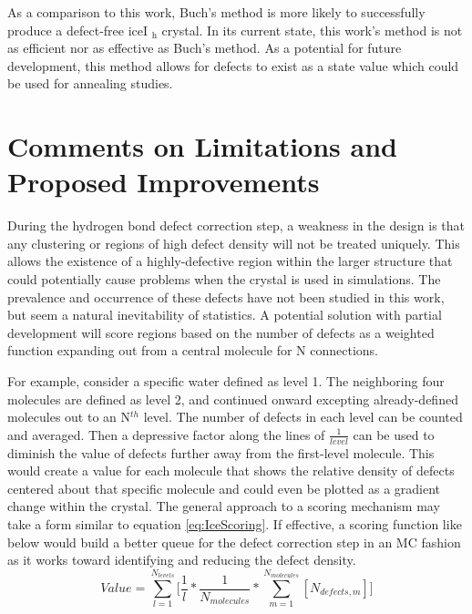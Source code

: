 As a comparison to this work, Buch's method is more likely to successfully produce a defect-free iceI $\mathrm{_{h}}$ crystal.
In its current state, this work's method is not as efficient nor as effective as Buch's method.
As a potential for future development, this method allows for defects to exist as a state value which could be used for annealing studies.



\section{Comments on Limitations and Proposed Improvements}

During the hydrogen bond defect correction step, a weakness in the design is that any clustering or regions of high defect density will not be treated uniquely.
This allows the existence of a highly-defective region within the larger structure that could potentially cause problems when the crystal is used in simulations. 
The prevalence and occurrence of these defects have not been studied in this work, but seem a natural inevitability of statistics. 
A potential solution with partial development will score regions based on the number of defects as a weighted function expanding out from a central molecule for N connections. 

For example, consider a specific water defined as level 1. 
The neighboring four molecules are defined as level 2, and continued onward excepting already-defined molecules out to an N$^{th}$ level. 
The number of defects in each level can be counted and averaged.
Then a depressive factor along the lines of $\frac{1}{level}$ can be used to diminish the value of defects further away from the first-level molecule.
This would create a value for each molecule that shows the relative density of defects centered about that specific molecule and could even be plotted as a gradient change within the crystal.
The general approach to a scoring mechanism may take a form similar to equation \ref{eq:IceScoring}.
If effective, a scoring function like below would build a better queue for the defect correction step in an MC fashion as it works toward identifying and reducing the defect density.
\begin{equation}
\label{eq:IceScoring}
Value = \sum_{l=1}^{N_{levels}} \Big[\frac{1}{l} * \frac{1} {N_{molecules}} *\sum_{m=1}^{N_{molecules}}[N_{defects, m}]\Big]
\end{equation}





